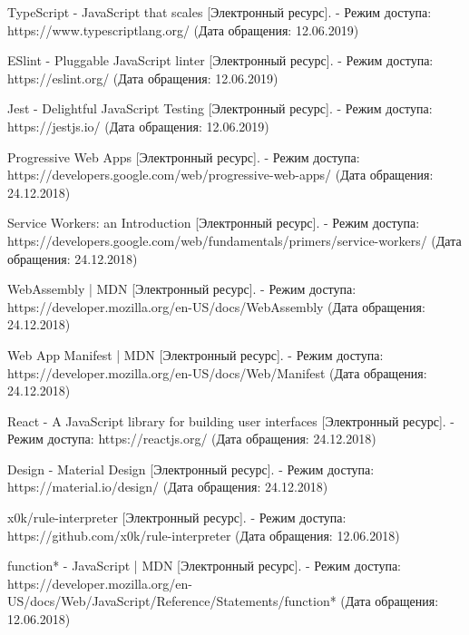 \begingroup
\renewcommand{\section}[2]{\anonsection{Библиографический список}}
\begin{thebibliography}{00}

  TypeScript - JavaScript that scales
  [Электронный ресурс]. - Режим доступа: https://www.typescriptlang.org/
  (Дата обращения: 12.06.2019)

  ESlint - Pluggable JavaScript linter
  [Электронный ресурс]. - Режим доступа: https://eslint.org/
  (Дата обращения: 12.06.2019)

  Jest - Delightful JavaScript Testing
  [Электронный ресурс]. - Режим доступа: https://jestjs.io/
  (Дата обращения: 12.06.2019)

  Progressive Web Apps
  [Электронный ресурс]. - Режим доступа: https://developers.google.com/web/progressive-web-apps/
  (Дата обращения: 24.12.2018)

  Service Workers: an Introduction
  [Электронный ресурс]. - Режим доступа: https://developers.google.com/web/fundamentals/primers/service-workers/
  (Дата обращения: 24.12.2018)

  WebAssembly | MDN
  [Электронный ресурс]. - Режим доступа: https://developer.mozilla.org/en-US/docs/WebAssembly
  (Дата обращения: 24.12.2018)

  Web App Manifest | MDN
  [Электронный ресурс]. - Режим доступа: https://developer.mozilla.org/en-US/docs/Web/Manifest
  (Дата обращения: 24.12.2018)

  React - A JavaScript library for building user interfaces
  [Электронный ресурс]. - Режим доступа: https://reactjs.org/
  (Дата обращения: 24.12.2018)

  Design - Material Design
  [Электронный ресурс]. - Режим доступа: https://material.io/design/
  (Дата обращения: 24.12.2018)

  x0k/rule-interpreter
  [Электронный ресурс]. - Режим доступа: https://github.com/x0k/rule-interpreter
  (Дата обращения: 12.06.2018)

  function* - JavaScript | MDN
  [Электронный ресурс]. - Режим доступа: https://developer.mozilla.org/en-US/docs/Web/JavaScript/Reference/Statements/function*
  (Дата обращения: 12.06.2018)


\end{thebibliography}
